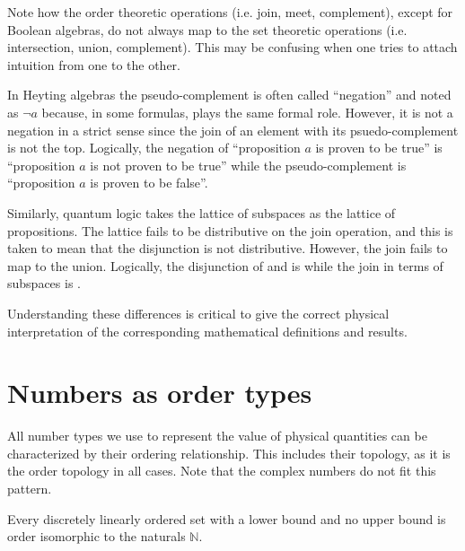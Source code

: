\documentclass{bareminimum}
\begin{document}
\begin{remark}
	Note how the order theoretic operations (i.e. join, meet, complement), except for Boolean algebras, do not always map to the set theoretic operations (i.e. intersection, union, complement). This may be confusing when one tries to attach intuition from one to the other.
	
	In Heyting algebras the pseudo-complement is often called ``negation'' and noted as $\neg a$ because, in some formulas, plays the same formal role. However, it is not a negation in a strict sense since the join of an element with its psuedo-complement is not the top. Logically, the negation of ``proposition $a$ is proven to be true'' is ``proposition $a$ is not proven to be true'' while the pseudo-complement is ``proposition $a$ is proven to be false''.
	
	Similarly, quantum logic takes the lattice of subspaces as the lattice of propositions. The lattice fails to be distributive on the join operation, and this is taken to mean that the disjunction is not distributive. However, the join fails to map to the union. Logically, the disjunction of  and  is  while the join in terms of subspaces is .
	
	Understanding these differences is critical to give the correct physical interpretation of the corresponding mathematical definitions and results.
	
\end{remark}

\section{Numbers as order types}

All number types we use to represent the value of physical quantities can be characterized by their ordering relationship. This includes their topology, as it is the order topology in all cases. Note that the complex numbers do not fit this pattern.

\begin{prop}
	Every discretely linearly ordered set with a lower bound and no upper bound is order isomorphic to the naturals $\mathbb{N}$.
\end{prop}
\end{document}
